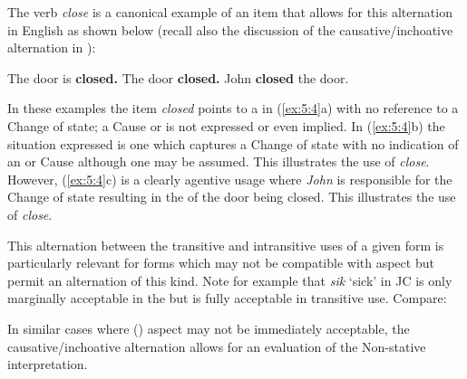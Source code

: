 The verb \textit{close} is a canonical example of an item that allows for this alternation in English as shown below (recall also the discussion of the causative\slash inchoative alternation in ):

\ea\label{ex:5:4}
 \citep[53]{Pustejovsky1991}
\ea The door is \textbf{closed.}
\ex The door \textbf{closed.}
\ex John \textbf{closed} the door.
\z
\z

In these examples the item \textit{closed} points to a  in (\ref{ex:5:4}a) with no reference to a Change of state; a Cause or  is not expressed or even implied. In (\ref{ex:5:4}b) the situation expressed is one which captures a Change of state with no indication of an  or Cause although one may be assumed. This illustrates the  use of \textit{close}. However, (\ref{ex:5:4}c) is a clearly agentive usage where \textit{John} is responsible for the Change of state resulting in the  of the door being closed. This illustrates the  use of \textit{close}. 

This alternation between the transitive and intransitive uses of a given form is particularly relevant for forms which may not be compatible with  aspect but permit an alternation of this kind. Note for example that \textit{sik} `sick' in JC is only marginally acceptable in the  but is fully acceptable in transitive use. Compare:

\ea%
\label{ex:5:5}
 
\z
\z

In similar cases where  () aspect may not be immediately acceptable, the causative\slash inchoative alternation allows for an evaluation of the Non-stative interpretation. 


